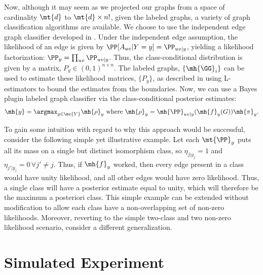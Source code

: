 \documentclass[10pt,journal,cspaper,compsoc]{IEEEtran}
\begin{document}
Now, although it may seem as we projected our graphs from a space of cardinality $\mt{d}$ to $\mt{d} \times n!$, given the labeled graphs, a variety of graph classification algorithms are available.  We choose to use the independent edge graph classifier developed in \cite{VP11sigsub}.  Under the independent edge assumption, the likelihood of an edge is given by $\PP[A_{uv}|Y=y]=\PP_{uv|y}$, yielding a likelihood factorization: $\PP_y=\prod_{uv}\PP_{uv|y}$. Thus, the class-conditional distribution is given by a matrix, $P_y \in (0,1)^{n \times n}$.   The labeled graphs, $\{\mh{\GG}_i\}$ can be used to estimate these likelihood matrices, $\{P_y\}$, as described in \cite{VP11sigsub} using L-estimators to bound the estimates from the boundaries.   Now, we can use a Bayes plugin labeled graph classifier via the class-conditional posterior estimates:
\begin{align}
	\mh{y}=\argmax_{y \in \mc{Y}} \mh{\rho}_y 
	\text{ where } \mh{\rho}_y=\mh{\PP}_{uv|y}(\mh{f}_y(G)) \mh{\pi}_y.
\end{align}


To gain some intuition with regard to why this approach would be successful, consider the following simple yet illustrative example.  Let each $\mt{\PP}_y$ puts all its mass on a single but distinct isomorphism class, so $\eta_{j|y_j}=1$ and $\eta_{j'|y_j}=0 \, \forall j' \neq j$.  Thus, if $\mh{f}_y$ worked, then every edge present in a class would have unity likelihood, and all other edges would have zero likelihood.  Thus, a single class will have a posterior estimate equal to unity, which will therefore be the maximum a posteriori class.  This simple example can be extended without modification
to allow each class have a non-overlapping set of non-zero likelihoods.  Moreover, reverting to the simple two-class and two non-zero likelihood scenario, consider a different generalization.  %





\section{Simulated Experiment} %
\label{sec:simulated_experiment}
\end{document}
